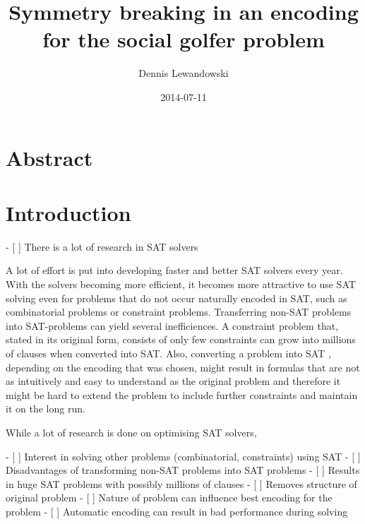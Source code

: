 \documentclass[a4paper]{scrartcl}
\title{Symmetry breaking in an encoding for the social golfer problem}
\author{Dennis Lewandowski}
\date{2014-07-11}
\begin{document}
\maketitle

\section{Abstract}

\section{Introduction}

- [ ] There is a lot of research in SAT solvers

A lot of effort is put into developing faster and better SAT solvers every year. With the solvers becoming more efficient, it becomes more attractive to use SAT solving even for problems that do not occur naturally encoded in SAT, such as combinatorial problems or constraint problems. Transferring non-SAT problems into SAT-problems can yield several inefficiences. A constraint problem that, stated in its original form, consists of only few constraints can grow into millions of clauses when converted into SAT. Also, converting a problem into SAT , depending on the encoding that was chosen, might result in formulas that are not as intuitively and easy to understand as the original problem and therefore it might be hard to extend the problem to include further constraints and maintain it on the long run.

While a lot of research is done on optimising SAT solvers, 





- [ ] Interest in solving other problems (combinatorial, constraints)
      using SAT
- [ ] Disadvantages of transforming non-SAT problems into SAT problems
    - [ ] Results in huge SAT problems with possibly millions of clauses
    - [ ] Removes structure of original problem
    - [ ] Nature of problem can influence best encoding for the problem
        - [ ] Automatic encoding can result in bad performance during
              solving
\end{document}
